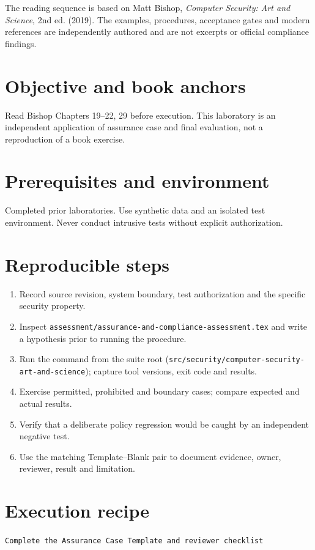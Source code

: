 \documentclass[10pt,letterpaper]{article}
\begin{document}
\makedoctocpage
\begin{notebox}
The reading sequence is based on Matt Bishop, \emph{Computer Security: Art and Science}, 2nd ed. (2019). The examples, procedures, acceptance gates and modern references are independently authored and are not excerpts or official compliance findings.
\end{notebox}
\section{Objective and book anchors}
Read Bishop Chapters 19--22, 29 before execution. This laboratory is an independent application of assurance case and final evaluation, not a reproduction of a book exercise.
\section{Prerequisites and environment}
Completed prior laboratories. Use synthetic data and an isolated test environment. Never conduct intrusive tests without explicit authorization.
\section{Reproducible steps}
\begin{enumerate}
\item Record source revision, system boundary, test authorization and the specific security property.
\item Inspect \texttt{assessment/assurance-and-compliance-assessment.tex} and write a hypothesis prior to running the procedure.
\item Run the command from the suite root (\texttt{src/security/computer-security-art-and-science}); capture tool versions, exit code and results.
\item Exercise permitted, prohibited and boundary cases; compare expected and actual results.
\item Verify that a deliberate policy regression would be caught by an independent negative test.
\item Use the matching Template--Blank pair to document evidence, owner, reviewer, result and limitation.
\end{enumerate}
\section{Execution recipe}
\begin{viewbox}\raggedright\small\texttt{Complete the Assurance Case Template and reviewer checklist}\end{viewbox}
\end{document}
